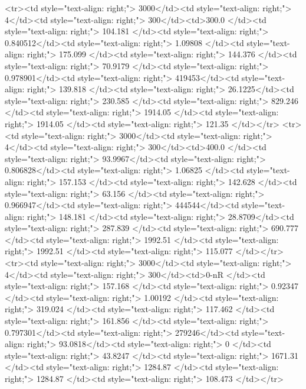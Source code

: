 <tr><td style="text-align: right;">      3000</td><td style="text-align: right;">         4</td><td style="text-align: right;">           300</td><td>300.0        </td><td style="text-align: right;">               104.181 </td><td style="text-align: right;">           0.840512</td><td style="text-align: right;">         1.09808 </td><td style="text-align: right;">        175.099 </td><td style="text-align: right;">           144.376 </td><td style="text-align: right;">              70.9179  </td><td style="text-align: right;">             0.978901</td><td style="text-align: right;">              419453</td><td style="text-align: right;">                      139.818 </td><td style="text-align: right;">            26.1225</td><td style="text-align: right;">               230.585  </td><td style="text-align: right;">       829.246 </td><td style="text-align: right;">   1914.05 </td><td style="text-align: right;">      1914.05 </td><td style="text-align: right;">                121.35  </td></tr>
<tr><td style="text-align: right;">      3000</td><td style="text-align: right;">         4</td><td style="text-align: right;">           300</td><td>400.0        </td><td style="text-align: right;">                93.9967</td><td style="text-align: right;">           0.806828</td><td style="text-align: right;">         1.06825 </td><td style="text-align: right;">        157.153 </td><td style="text-align: right;">           142.628 </td><td style="text-align: right;">              63.156   </td><td style="text-align: right;">             0.966947</td><td style="text-align: right;">              444544</td><td style="text-align: right;">                      148.181 </td><td style="text-align: right;">            28.8709</td><td style="text-align: right;">               287.839  </td><td style="text-align: right;">       690.777 </td><td style="text-align: right;">   1992.51 </td><td style="text-align: right;">      1992.51 </td><td style="text-align: right;">                115.077 </td></tr>
<tr><td style="text-align: right;">      3000</td><td style="text-align: right;">         4</td><td style="text-align: right;">           300</td><td>0-nR         </td><td style="text-align: right;">               157.168 </td><td style="text-align: right;">           0.92347 </td><td style="text-align: right;">         1.00192 </td><td style="text-align: right;">        319.024 </td><td style="text-align: right;">           117.462 </td><td style="text-align: right;">             161.856   </td><td style="text-align: right;">             0.797301</td><td style="text-align: right;">              279246</td><td style="text-align: right;">                       93.0818</td><td style="text-align: right;">             0     </td><td style="text-align: right;">                43.8247 </td><td style="text-align: right;">      1671.31  </td><td style="text-align: right;">   1284.87 </td><td style="text-align: right;">      1284.87 </td><td style="text-align: right;">                108.473 </td></tr>
